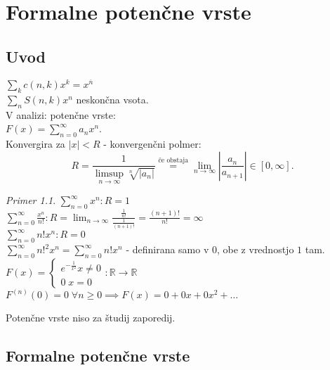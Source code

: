 \documentclass[a4paper, 12pt]{book}
\theoremstyle{definition}
\theoremstyle{remark}
\newtheorem*{ex}{Primer}
\newcommand{\R}{\mathbb{R}}
\begin{document}
\chapter{Formalne potenčne vrste}


\section{Uvod}

$\sum_k c(n,k) x^k = x^{\overline{n}}$ \\
$\sum_n S(n,k) x^n$ neskončna vsota. \\
V analizi: potenčne vrste: \\
$F(x) = \sum_{n=0}^{\infty} a_n x^n$. \\
Konvergira za $|x| < R$ - konvergenčni polmer:
\begin{equation*}
  R = \frac{1}{\limsup_{n \to \infty} \sqrt[n]{|a_n|}} \stackrel{\text{če obstaja}}{=}
  \lim_{n \to \infty} \left|\frac{a_n}{a_{n+1}}\right| \in [0, \infty].
\end{equation*}
\begin{ex}
  $\sum_{n=0}^{\infty} x^n: R = 1$ \\
  $\sum_{n=0}^{\infty} \frac{x^n}{n!}: R = \lim_{n \to \infty} \frac{\frac{1}{n!}}{\frac{1}{(n+1)!}}
    = \frac{(n+1)!}{n!} = \infty$ \\
  $\sum_{n=0}^{\infty} n! x^n: R = 0$ \\
  $\sum_{n=0}^{\infty} n!^2 x^n = \sum_{n=0}^{\infty} n! x^n$ - definirana samo v $0$, obe z vrednostjo $1$ tam. \\
  $F(x) = \begin{cases}e^{-\frac{1}{x^2}} x \neq 0 \\ 0 \; x = 0 \end{cases}: \R \to \R$ \\
  $F^{(n)}(0) = 0 \; \forall n \geq 0 \implies F(x) = 0 + 0x + 0x^2 + \dots$
\end{ex}
Potenčne vrste niso  za študij zaporedij.


\section{Formalne potenčne vrste}
\end{document}
